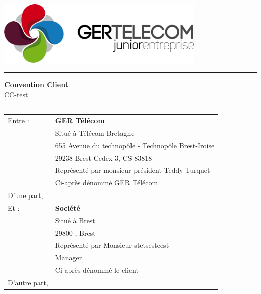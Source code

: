 \documentclass[10pt,a4paper]{article}
\renewcommand{\headrulewidth}{0pt}
\begin{document}
\centering
\includegraphics[width=10cm]{GER.png}\\
\rule{\linewidth}{.5pt}
\Huge \textbf{\textsf{Convention Client}}\\
\vspace{0.2cm}
\huge \textsf{CC-test}
\rule{\linewidth}{.5pt}
\normalsize
\flushleft
\vspace{1cm}
\begin{tabular}{ll}
Entre : 	&\textbf{GER Télécom}\\
&Situé à Télécom Bretagne \\
&655 Avenue du technopôle - Technopôle Brest-Iroise \\
&29238 Brest Cedex 3, CS 83818\\
&Représenté par monsieur président Teddy Turquet\\
\vspace{0.5cm}&Ci-après dénommé GER Télécom\\
\vspace{1cm}D'une part,\\
Et :		&\textbf{Société}\\
&Situé à Brest\\
&29800 , Brest\\
&Représenté par Monsieur stetsesteest\\
&Manager\\
\vspace{0.5cm}&Ci-après dénommé le client\\
D'autre part,\\
\end{tabular}
\newpage
\renewcommand{\headrulewidth}{0pt}

\lipsum[1]
\lipsum[1]
\lipsum[1]
\lipsum[1]
\lipsum[1]
\lipsum[1]
\lipsum[1]
\lipsum[1]
\lipsum[1]
\lipsum[1]
\lipsum[1]
\lipsum[1]
\lipsum[1]
\lipsum[1]
\lipsum[1]
\lipsum[1]
\lipsum[1]
\lipsum[1]
\end{document}
